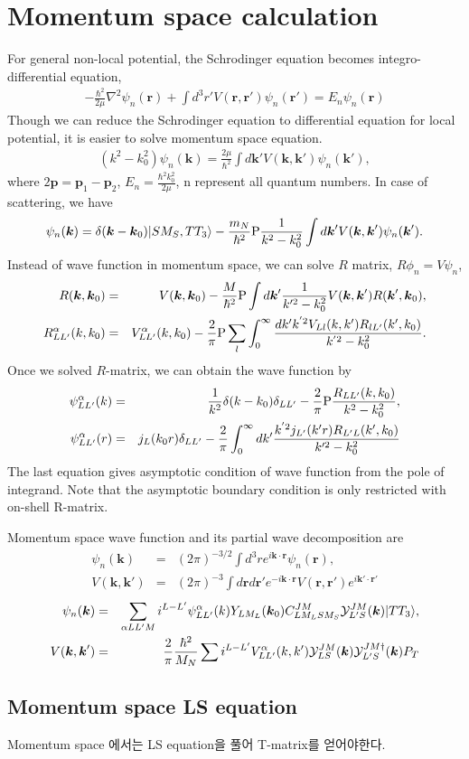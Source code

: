 \documentclass[10pt]{article}
\def\bm{\boldsymbol}
\newcommand{\bea}{\begin{eqnarray}}
\newcommand{\eea}{\end{eqnarray}}
\newcommand{\no}{\nonumber \\}
\def\vp{{\bm p}}
\def\vk{{\bm k}}
\def\vr{{\bm r}}
\def\ra{\rangle}
\begin{document}
\section{Momentum space calculation}
For general non-local potential, the Schrodinger equation becomes
integro-differential equation,
\bea
-\frac{\hbar^2}{2\mu}\nabla^2 \psi_n(\vr)
+\int d^3 r' V(\vr,\vr')\psi_n(\vr')
=E_n\psi_n(\vr) 
\eea
Though we can reduce the Schrodinger equation to
differential equation for local potential,
it is easier to solve momentum space equation.
\bea
(k^2-k_0^2)\psi_n(\vk)
=\frac{2\mu}{\hbar^2}\int d\vk' V(\vk,\vk')\psi_n(\vk'),
\eea 
where $2\vp=\vp_1-\vp_2$, $E_n=\frac{\hbar^2 k_0^2}{2\mu}$,
n represent all quantum numbers.
In case of scattering, we have
\bea
\psi_n(\vk)=\delta(\vk-\vk_0)|SM_S,TT_3\ra
            -\frac{m_N}{\hbar^2}{\rm P}
            \frac{1}{k^2-k_0^2}
            \int d\vk' V(\vk,\vk')\psi_n(\vk'). 
\eea
Instead of wave function in momentum space, we can solve $R$ matrix,
$R\phi_n=V\psi_n$,
\bea
R(\vk,\vk_0)&=&V(\vk,\vk_0)-\frac{M}{\hbar^2}{\rm P}
        \int d\vk' \frac{1}{k'^2-k_0^2}
        V(\vk,\vk')R(\vk',\vk_0) ,\no
R_{LL'}^\alpha(k,k_0)
&=& V_{LL' }^\alpha(k,k_0)-\frac{2}{\pi}{\rm P}\sum_l
    \int_0^\infty \frac{dk' k^{'2} V_{L l}(k,k')R_{lL'}(k',k_0)}
    {k^{'2}-k_0^2}.       
\eea
Once we solved $R$-matrix, we can obtain the wave function by
\bea
\psi_{LL'}^\alpha(k)
&=&\frac{1}{k^2}\delta(k-k_0)\delta_{LL'}
 -\frac{2}{\pi}{\rm P}\frac{R_{LL'}(k,k_0)}{k^2-k_0^2},\no
\psi_{LL'}^\alpha(r)
&=& j_L(k_0 r)\delta_{LL'}-\frac{2}{\pi}\int_0^\infty dk'
    \frac{k^{'2} j_{L'}(k'r) R_{L'L}(k',k_0)}
         {k'^2-k_0^2} 
\eea
The last equation gives asymptotic condition
of wave function from the pole of integrand.
Note that the asymptotic boundary condition is only 
restricted with on-shell R-matrix.


Momentum space wave function and its partial wave decomposition
are
\bea
\psi_n(\vk)&=&(2\pi)^{-3/2}\int d^3 r e^{i\vk\cdot\vr}\psi_n(\vr),\no
V(\vk,\vk')&=&(2\pi)^{-3}\int d\vr d\vr' e^{-i\vk\cdot\vr}
               V(\vr,\vr') e^{i\vk'\cdot\vr'}    
\eea
\bea
\psi_n(\vk)&=&\sum_{\alpha L L' M}
    i^{L-L'}\psi_{LL'}^\alpha(k)
    Y_{L M_L}(\vk_0) C_{L M_L S M_S}^{JM} {\cal Y}^{JM}_{L'S}(\vk)
    |T T_3\ra,\no
V(\vk,\vk')&=&\frac{2}{\pi}\frac{\hbar^2}{M_N}\sum
   i^{L-L'} V^\alpha_{LL'}(k,k')
   {\cal Y}^{JM}_{LS}(\vk){\cal Y}^{JM\dagger}_{L'S}(\vk)P_T   
\eea





\subsection{Momentum space LS equation}
Momentum space 에서는 LS equation을 풀어 T-matrix를 얻어야한다.
\end{document}
